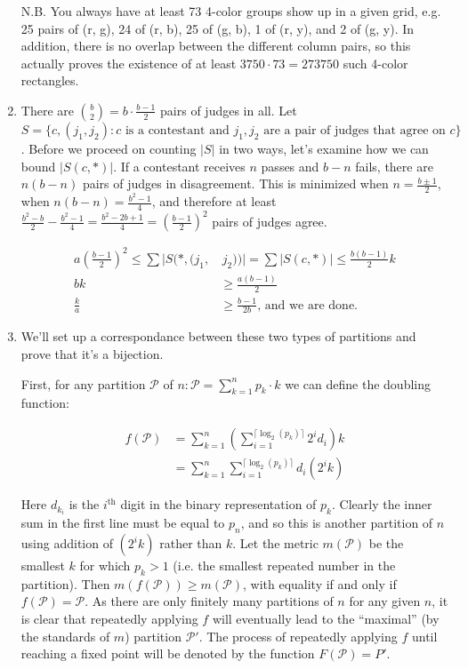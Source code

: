 \documentclass{book}
\numberwithin{equation}{section}
\begin{document}
\begin{enumerate}[label={7.\arabic*}]
N.B. You always have at least 73 4-color groups show up in a given grid, e.g. 25 pairs of (r, g), 24 of (r, b), 25 of (g, b), 1 of (r, y),
and 2 of (g, y). 
In addition, there is no overlap between the different column pairs, so this actually proves the existence of at least
$3750 \cdot 73 = 273750$ such 4-color rectangles.

\item
There are ${b \choose 2} = b \cdot \frac{b-1}{2}$ pairs of judges in all. Let $S = \{ c, (j_1, j_2) : c \text{ is a contestant and }
j_1, j_2 \text{ are a pair of judges that agree on } c \}$. Before we proceed on counting $|S|$ in two ways, let's examine
how we can bound $|S(c, *)|$. If a contestant receives $n$ passes and $b-n$ fails, there are $n(b-n)$ pairs of judges in
disagreement. This is minimized when $n = \frac{b \pm 1}{2}$, when $n(b-n) = \frac{b^2 - 1}{4}$, and therefore at
least $\frac{b^2 - b}{2} - \frac{b^2 - 1}{4} = \frac{b^2 - 2b + 1}{4} = \left( \frac{b-1}{2} \right)^2$ pairs of judges agree.

\begin{align*}
a\left(\frac{b-1}{2}\right)^2 \leq \sum |S(*, (j_1, & \, j_2))| = \sum|S(c, *)| \leq \frac{b(b-1)}{2}k \\
bk & \geq \frac{a(b-1)}{2} \\
\frac{k}{a} & \geq \frac{b-1}{2b} \text{, and we are done.}
\end{align*}

\item
We'll set up a correspondance between these two types of partitions and
prove that it's a bijection.

First, for any partition $\mathcal{P}$ of $n : \mathcal{P} = \sum_{k=1}^n p_k \cdot k$ we can define the doubling function:

\begin{align*}
f(\mathcal{P}) & = \sum_{k=1}^n \left( \sum_{i=1}^{\lceil \log_2(p_k) \rceil} 2^i d_i \right) k \\
& = \sum_{k=1}^n \sum_{i=1}^{\lceil \log_2(p_k) \rceil} d_i (2^i k)
\end{align*}

Here $d_{k_i}$ is the $i^{\text{th}}$ digit in the binary representation of $p_k$. Clearly the inner sum in the first line
must be equal to $p_n$, and so this is another partition of $n$ using addition of $(2^i k)$ rather than $k$.
Let the metric $m(\mathcal{P})$ be the smallest $k$ for which $p_k > 1$
(i.e. the smallest repeated number in the partition). Then $m(f(\mathcal{P})) \geq m(\mathcal{P})$, with equality if
and only if $f(\mathcal{P}) = \mathcal{P}$. As there are only finitely many partitions of $n$ for any given $n$, it is
clear that repeatedly applying $f$ will eventually lead to the ``maximal'' (by the standards of $m$) partition
$\mathcal{P}'$. The process of repeatedly applying $f$ until reaching a fixed point will be denoted by the
function $F(\mathcal{P}) = P'$.


\end{enumerate}
\end{document}
